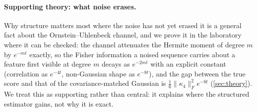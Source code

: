 \paragraph{Supporting theory: what noise erases.}
Why structure matters most where the noise has not yet erased it is a general fact about the
Ornstein--Uhlenbeck channel, and we prove it in the laboratory where it can be checked: the
channel attenuates the Hermite moment of degree $m$ by $e^{-mt}$ exactly, so the Fisher
information a noised sequence carries about a feature first visible at degree $m$ decays as
$e^{-2mt}$ with an explicit constant (correlation as $e^{-4t}$, non-Gaussian shape as $e^{-8t}$),
and the gap between the true score and that of the covariance-matched Gaussian is
$\tfrac16\lVert\kappa_4\rVert_F^2e^{-8t}$ (\cref{sec:theory}). We treat this as supporting
rather than central: it explains where the structured estimator gains, not why it is exact.
